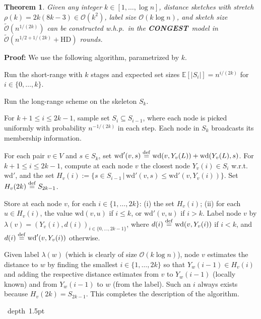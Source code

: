 \documentclass[letterpaper,11pt]{article}
\newtheorem{theorem}{Theorem}[section]
\newcommand{\blackslug}{\hbox{\hskip 1pt \vrule width 4pt height 8pt
depth 1.5pt \hskip 1pt}}
\newcommand{\QED}{\quad\blackslug\lower 8.5pt\null\par}
\newenvironment{proof}[1][Proof:]{\noindent \textbf{#1}\xspace}{\QED}
\newcommand{\E}{\mathbb{E}}
\newcommand{\BO}{\mathcal{O}}
\newcommand{\DEF}{\ensuremath{\stackrel{\rm def}{=}}}
\newcommand{\CONGEST}{\textbf{CONGEST}}
\newcommand{\HD}{\mathrm{HD}}
\newcommand{\Wd}{\mathrm{wd}}
\newcommand{\Lead}{Y}
\begin{document}
\begin{theorem}\label{theorem:sketches_small}
Given any integer $k\in [1,\ldots,\log n]$, distance sketches with
stretch $\rho(k)= 2k(8k-3)\in\BO(k^2)$, label size $\BO(k\log n)$,
and sketch size $\tilde{\BO}(n^{1/(2k)})$ can be constructed w.h.p.\ in
the \CONGEST\ model in $\tilde{\BO}(n^{1/2+1/(2k)}+\HD)$ rounds.
\end{theorem}
\begin{proof}
We use the following  algorithm, parametrized by $k$.
\begin{compactenum}
\item Run the short-range with $k$ stages and expected set sizes
$\E[|S_i|]=n^{i/(2k)}$ for $i\in \{0,\ldots,k\}$.
\item Run the long-range scheme on the skeleton $S_k$.
\item For $k+1\le i\le 2k-1$,  sample set $S_i\subseteq S_{i-1}$, where each node
is picked uniformly with probability $n^{-1/(2k)}$ in each step. Each node in
$S_k$ broadcasts its membership information.
\item For each pair $v\in V$ and $s\in S_k$, set
${\Wd'}(v,s)\DEF \Wd(v,\Lead_v(L))+\Wd(\Lead_v(L),s)$. For $k+1\le
i\le 2k-1$, compute at each node $v$ the closest node $\Lead_v(i)\in S_i$
w.r.t.\ $\Wd'$, and the set $H_v(i):=\{s\in
S_{i-1}\,|\,\Wd'(v,s)\leq \Wd'(v,\Lead_v(i))\}$. Set $H_v(2k)\DEF
S_{2k-1}$.
\item Store at each node $v$, for each $i\in \{1,\ldots,2k\}$: (i) the set
  $H_v(i)$; (ii) for 
each $u\in H_v(i)$, the value $\Wd(v,u)$ if $i\leq k$, or $\Wd'(v,u)$ if
$i>k$. Label node $v$ by $\lambda(v)=(\Lead_v(i),d(i))_{i\in
\{0,\ldots,2k-1\}}$, where $d(i)\DEF\Wd(v,\Lead_v(i))$ if $i<k$, and
$d(i)\DEF\Wd'(v,\Lead_v(i))$ otherwise. \end{compactenum}
Given label $\lambda(w)$ (which is clearly of size $\BO(k\log n)$), node $v$
estimates the distance to $w$ by finding the smallest $i\in \{1,\ldots,2k\}$ so
that $\Lead_w(i-1)\in H_v(i)$ and adding the respective distance estimates from
$v$ to $\Lead_w(i-1)$ (locally known) and from $\Lead_w(i-1)$ to $w$ (from the
label). Such an $i$ always exists because $H_v(2k)=S_{2k-1}$. This
completes the description of the algorithm.


\end{proof}
\end{document}
